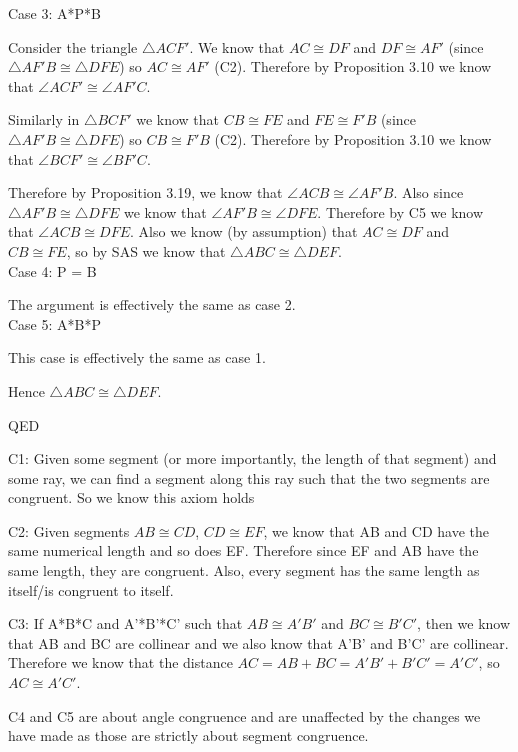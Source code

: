\documentclass[12pt,letterpaper]{article}
\newcommand{\QED}{\begin{flushright}QED\end{flushright}}
\newcommand{\prob}[1]{\newpage\noindent {\bf #1}}
\begin{document}
Case 3: A*P*B

Consider the triangle $\triangle ACF'$. We know that $AC \cong DF$ and $DF \cong AF'$ (since $\triangle AF'B \cong \triangle DFE$) so $AC \cong AF'$ (C2).  Therefore by Proposition 3.10 we know that $\angle ACF' \cong \angle AF'C$. 

Similarly in $\triangle BCF'$ we know that $CB \cong FE$ and $FE \cong F'B$ (since $\triangle AF'B \cong \triangle DFE$) so $CB \cong F'B$ (C2).  Therefore by Proposition 3.10 we know that $\angle BCF' \cong \angle BF'C$. 

Therefore by Proposition 3.19, we know that $\angle ACB \cong \angle AF'B$.  Also since $\triangle AF'B \cong \triangle DFE$ we know that $\angle AF'B \cong \angle DFE$.  Therefore by C5 we know that $\angle ACB \cong DFE$.  Also we know (by assumption) that $AC \cong DF$ and $CB \cong FE$, so by SAS we know that $\triangle ABC \cong \triangle DEF$.\\


\noindent Case 4: P = B

The argument is effectively the same as case 2.\\

\noindent Case 5: A*B*P

This case is effectively the same as case 1.

\noindent Hence $\triangle ABC \cong \triangle DEF$.

\QED





\prob{35}



C1: Given some segment (or more importantly, the length of that segment) and some ray, we can find a segment along this ray such that the two segments are congruent. So we know this axiom holds

C2: Given segments $AB \cong CD$, $CD \cong EF$, we know that AB and CD have the same numerical length and so does EF.  Therefore since EF and AB have the same length, they are congruent.  Also, every segment has the same length as itself/is congruent to itself.

C3: If A*B*C and A'*B'*C' such that $AB \cong A'B'$ and $BC \cong  B'C'$, then we know that AB and BC are collinear and we also know that A'B' and B'C' are collinear.  Therefore we know that the distance $AC = AB + BC = A'B' + B'C' = A'C'$, so $AC \cong A'C'$.

C4 and C5 are about angle congruence and are unaffected by the changes we have made as those are strictly about segment congruence.
\end{document}
